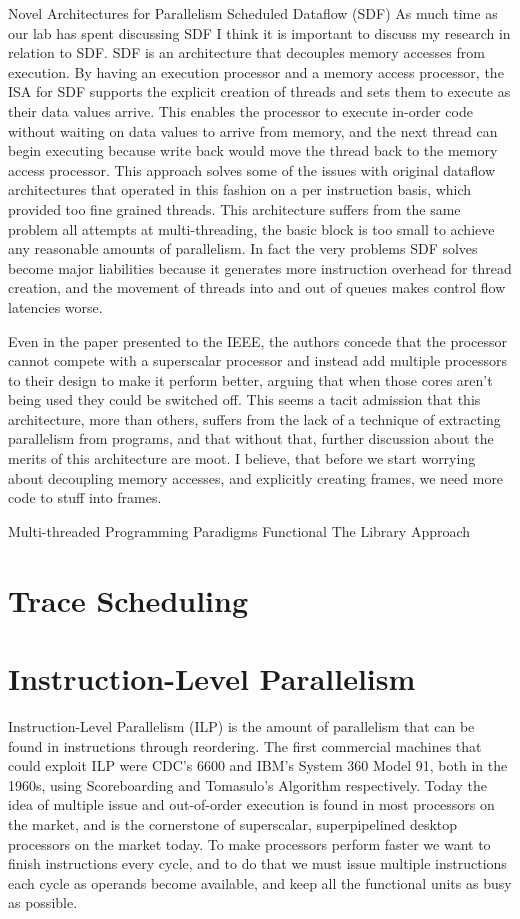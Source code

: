 \documentclass[12pt,twoside,letterpaper]{article}
\begin{document}
Novel Architectures for Parallelism
Scheduled Dataflow (SDF)
As much time as our lab has spent discussing SDF I think it is important to discuss my research in relation to SDF. SDF is an architecture that decouples memory accesses from execution. By having an execution processor and a memory access processor, the ISA for SDF supports the explicit creation of threads and sets them to execute as their data values arrive. This enables the processor to execute in-order code without waiting on data values to arrive from memory, and the next thread can begin executing because write back would move the thread back to the memory access processor. This approach solves some of the issues with original dataflow architectures that operated in this fashion on a per instruction basis, which provided too fine grained threads. This architecture suffers from the same problem all attempts at multi-threading, the basic block is too small to achieve any reasonable amounts of parallelism. In fact the very problems SDF solves become major liabilities because it generates more instruction overhead for thread creation, and the movement of threads into and out of queues makes control flow latencies worse.

Even in the paper presented to the IEEE, the authors concede that the processor cannot compete with a superscalar processor and instead add multiple processors to their design to make it perform better, arguing that when those cores aren’t being used they could be switched off. This seems a tacit admission that this architecture, more than others, suffers from the lack of a technique of extracting parallelism from programs, and that without that, further discussion about the merits of this architecture are moot. I believe, that before we start worrying about decoupling memory accesses, and explicitly creating frames, we need  more code to stuff into frames. 

Multi-threaded Programming Paradigms
Functional
The Library Approach

\section*{Trace Scheduling}

\section*{Instruction-Level Parallelism}
Instruction-Level Parallelism (ILP) is the amount of parallelism that can be found in instructions through reordering. The first commercial machines that could exploit ILP were CDC’s 6600 and IBM’s System 360 Model 91, both in the 1960s, using Scoreboarding and Tomasulo’s Algorithm respectively. Today the idea of multiple issue and out-of-order execution is found in most processors on the market, and is the cornerstone of superscalar, superpipelined desktop processors on the market today. To make processors perform faster we want to finish instructions every cycle, and to do that we must issue multiple instructions each cycle as operands become available, and keep all the functional units as busy as possible.
\end{document}
